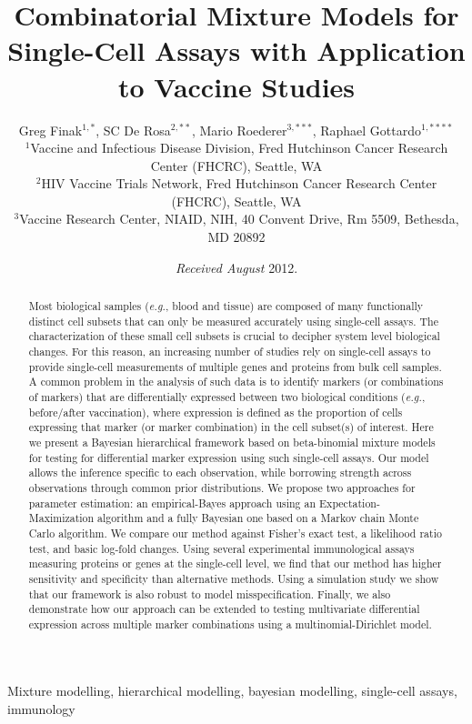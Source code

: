 \documentclass[useAMS,referee,usenatbib]{biom}
\title[MIMOSA: Combinatorial Mixture Models or Single-Cell Assays]{Combinatorial Mixture Models for Single-Cell Assays with Application to Vaccine Studies}
\author{Greg Finak$^{1,*}$\email{gfinak@fhcrc.org},
SC De Rosa$^{2,**}$\email{sderosa@fhcrc.org},
Mario Roederer$^{3,***}$\email{marior@mail.nih.gov},
Raphael Gottardo$^{1,****}$\email{rgotard@fhcrc.org}\\
$^{1}$Vaccine and Infectious Disease Division, Fred Hutchinson Cancer Research Center (FHCRC), Seattle, WA\\
$^{2}$HIV Vaccine Trials Network, Fred Hutchinson Cancer Research Center (FHCRC), Seattle, WA\\
$^{3}$Vaccine Research Center, NIAID, NIH, 40 Convent Drive, Rm 5509, Bethesda, MD 20892}
\begin{document}
\date{{\it Received August} 2012.}

\pagerange{\pageref{firstpage}-\pageref{lastpage}} 
\volume{ }
\pubyear{ }
\artmonth{ }


\label{firstpage}

\begin{abstract}
Most biological samples (\textit{e.g.}, blood and tissue) are composed of many functionally distinct cell subsets that can only be measured accurately using single-cell assays. The characterization of these small cell subsets is crucial to decipher system level biological changes. For this reason, an increasing number of studies rely on single-cell assays to provide single-cell measurements of multiple genes and proteins from bulk cell samples. A common problem in the analysis of such data is to identify markers (or combinations of markers) that are differentially expressed between two biological conditions (\textit{e.g.}, before/after vaccination), where expression is defined as the proportion of cells expressing that marker (or marker combination) in the cell subset(s) of interest.
Here we present a Bayesian hierarchical framework based on beta-binomial mixture models for testing for differential marker expression using such single-cell assays. Our model allows the inference specific to each observation, while borrowing strength across observations through common prior distributions. We propose two approaches for parameter estimation: an empirical-Bayes approach using an Expectation-Maximization algorithm and a fully Bayesian one based on a Markov chain Monte Carlo algorithm. We compare our method against Fisher's exact test, a likelihood ratio test, and basic log-fold changes. Using several experimental immunological assays measuring proteins or genes at the single-cell level, we find that our method has higher sensitivity and specificity than alternative methods. Using a simulation study we show that our framework is also robust to model misspecification. Finally, we also demonstrate how our approach can be extended to testing multivariate differential expression across multiple marker combinations using a multinomial-Dirichlet model. 
\end{abstract}

\begin{keywords}
Mixture modelling, hierarchical modelling, bayesian modelling, single-cell assays, immunology
\end{keywords}
\end{document}

